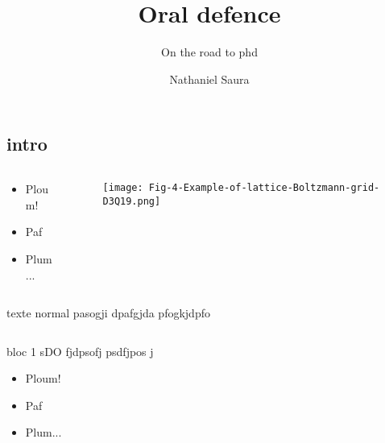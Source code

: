 \documentclass[11pt, xcolor=svgnames]{beamer}
\begin{document}
\title{Oral defence} %
\subtitle{\color{brick} On the road to phd} %
\author{Nathaniel Saura}

\begin{darkframes}

\frame{\maketitle}

    
\section{intro}
\begin{frame}
\begin{columns}
\begin{column}{.5\textwidth}
\begin{itemize}
  \item<1,3> Ploum!
  \item<3> Paf
  \item Plum...
  \end{itemize}
\end{column}
\begin{column}{.5\textwidth}
\RaggedRight
\vspace{-3cm}
\begin{figure}

\texttt{[image: Fig-4-Example-of-lattice-Boltzmann-grid-D3Q19.png]}

\end{figure}
\end{column}
\end{columns}
texte normal pasogji dpafgjda pfogkjdpfo
\end{frame}

\begin{frame}
\begin{columns}
\begin{column}{.5\textwidth}
\begin{block}{bloc 1}
sDO fjdpsofj psdfjpos j
\begin{itemize}
  \item<1,3> Ploum!
  \item<3> Paf
  \item Plum...
  \end{itemize}\end{block}
\end{column}


\end{columns}
\end{frame}
\end{darkframes}
\end{document}
